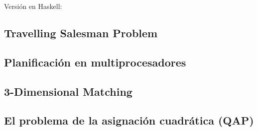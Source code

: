 \documentclass[a4paper, 11pt]{article} %
\begin{document}
        \small
  	\texttt{}
        \normalsize
        
        Versión en Haskell:
        
        \small
  	\texttt{}
        \normalsize
        
  \subsection{Travelling Salesman Problem}
        \small
  	\texttt{}
        \normalsize
  \subsection{Planificación en multiprocesadores}
        \small
  	\texttt{}
        \normalsize
  \subsection{3-Dimensional Matching}
        \small
  	\texttt{}
        \normalsize
  \subsection{El problema de la asignación cuadrática (QAP)}
        \small
        \normalsize

    
\end{document}
